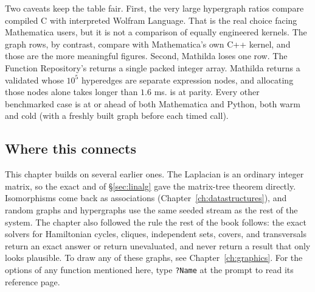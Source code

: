 Two caveats keep the table fair. First, the very large hypergraph ratios compare
compiled C with interpreted Wolfram Language. That is the real choice facing
Mathematica users, but it is not a comparison of equally engineered kernels. The
graph rows, by contrast, compare with Mathematica's own C++ kernel, and those are
the more meaningful figures. Second, Mathilda loses one row. The Function
Repository's  returns a single packed integer array.
Mathilda returns a validated  whose \(10^5\) hyperedges are
separate expression nodes, and allocating those nodes alone takes longer than
\(1.6\) ms.  is at parity. Every other benchmarked case is
at or ahead of both Mathematica and Python, both warm and cold (with a freshly
built graph before each timed call).


\subsection*{Where this connects}

This chapter builds on several earlier ones. The Laplacian is an ordinary
integer matrix, so the exact  and  of \S\ref{sec:linalg}
gave the matrix-tree theorem directly. Isomorphisms come back as associations
(Chapter~\ref{ch:datastructures}), and random graphs and hypergraphs use the
same seeded stream as the rest of the system. The chapter also followed the
rule the rest of the book follows: the exact solvers for Hamiltonian cycles,
cliques, independent sets, covers, and transversals return an exact answer or
return unevaluated, and never return a result that only looks plausible. To draw
any of these graphs, see Chapter~\ref{ch:graphics}. For the options of any
function mentioned here, type \texttt{?Name} at the prompt to read its
reference page.
